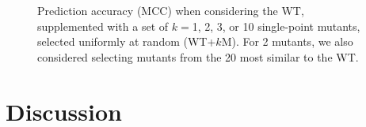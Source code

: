 \documentclass[a4,center,fleqn]{NAR}
\begin{document}
\begin{figure}
	\label{Vsrsample}
	\caption{Prediction accuracy (MCC) when considering the WT, supplemented with a set of $k=$1, 2, 3, or 10 single-point mutants, selected uniformly at random ({\sf WT+$k$M}). For 2 mutants, we also considered selecting mutants from the 20 most similar to the WT.}\label{fig:variantanalysis}
\end{figure}












\section{Discussion}
\end{document}
